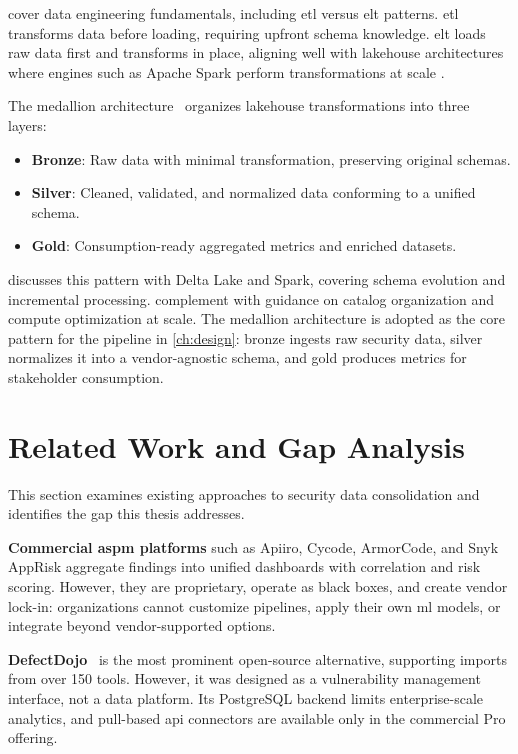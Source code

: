 \textcite{Reis2022} cover data engineering fundamentals, including \gls{etl} versus \gls{elt} patterns. \gls{etl} transforms data before loading, requiring upfront schema knowledge. \gls{elt} loads raw data first and transforms in place, aligning well with lakehouse architectures where engines such as Apache Spark perform transformations at scale \parencite{Lee2024, Thalpati2024}.

The medallion architecture~\parencite{Strengholt2025} organizes lakehouse transformations into three layers:
\begin{itemize}
    \item \textbf{Bronze}: Raw data with minimal transformation, preserving original schemas.
    \item \textbf{Silver}: Cleaned, validated, and normalized data conforming to a unified schema.
    \item \textbf{Gold}: Consumption-ready aggregated metrics and enriched datasets.
\end{itemize}
\textcite{Strengholt2025} discusses this pattern with Delta Lake and Spark, covering schema evolution and incremental processing. \textcite{Thalpati2024} complement with guidance on catalog organization and compute optimization at scale. The medallion architecture is adopted as the core pattern for the pipeline in \autoref{ch:design}: bronze ingests raw security data, silver normalizes it into a vendor-agnostic schema, and gold produces metrics for stakeholder consumption.


\section{Related Work and Gap Analysis}
\label{sec:related-work}

This section examines existing approaches to security data consolidation and identifies the gap this thesis addresses.

\textbf{Commercial \gls{aspm} platforms} such as Apiiro, Cycode, ArmorCode, and Snyk AppRisk aggregate findings into unified dashboards with correlation and risk scoring. However, they are proprietary, operate as black boxes, and create vendor lock-in: organizations cannot customize pipelines, apply their own \gls{ml} models, or integrate beyond vendor-supported options.

\textbf{DefectDojo}~\parencite{DefectDojo2024} is the most prominent open-source alternative, supporting imports from over 150 tools. However, it was designed as a vulnerability management interface, not a data platform. Its PostgreSQL backend limits enterprise-scale analytics, and pull-based \gls{api} connectors are available only in the commercial Pro offering.

